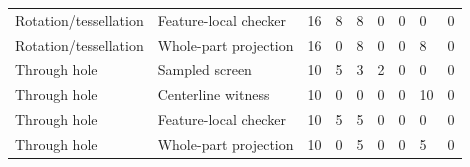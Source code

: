 \begin{longtable}{lllllllll}
Rotation/tessellation & Feature-local checker & 16 & 8 & 8 & 0 & 0 & 0 & 0 \\
Rotation/tessellation & Whole-part projection & 16 & 0 & 8 & 0 & 0 & 8 & 0 \\
Through hole & Sampled screen & 10 & 5 & 3 & 2 & 0 & 0 & 0 \\
Through hole & Centerline witness & 10 & 0 & 0 & 0 & 0 & 10 & 0 \\
Through hole & Feature-local checker & 10 & 5 & 5 & 0 & 0 & 0 & 0 \\
Through hole & Whole-part projection & 10 & 0 & 5 & 0 & 0 & 5 & 0 \\
\bottomrule
\end{longtable}
